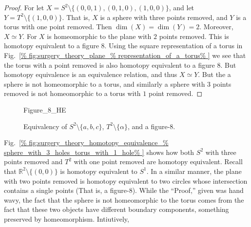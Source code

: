 \documentclass[crop=false,class=article,oneside]{standalone}
\begin{document}
        \begin{proof}
            For let
            $X=S^{2}\setminus\{(0,0,1),(0,1,0),(1,0,0)\}$,
            and let
            $Y=T^{2}\setminus\{(1,0,0)\}$.
            That is, $X$ is a sphere with three points removed,
            and $Y$ is a torus with one point removed. Then
            $\dim(X)=\dim(Y)=2$.
            Moreover, $X\simeq Y$. For $X$ is homeomorphic
            to the plane with $2$ points removed. This is
            homotopy equivalent to a figure $8$.
            Using the square representation of a torus in
            Fig.~\ref{%
                fig:surgery_theory_plane_%
                representation_of_a_torus%
            }
            we see that the torus with a point removed
            is also homotopy equivalent to a figure $8$.
            But homotopy equivalence is an equivalence
            relation, and thus $X\simeq Y$. But the a sphere
            is not homeomorphic to a torus, and similarly a
            sphere with $3$ points removed is not homeomorphic
            to a torus with $1$ point removed.
        \end{proof}
        \begin{figure}[H]
                \centering
                \captionsetup{type=figure}
                {Figure_8_HE}
                \caption{%
                    Equivalency of $S^{2}\setminus\{a,b,c\}$,
                    $T^{2}\setminus\{\alpha\}$,
                    and a figure-8.%
                }
                \label{%
                    fig:surgery_theory_homotopy_%
                    equivalence_sphere_with_3_%
                    holes_torus_with_1_hole%
                }
        \end{figure} 
        Fig.~\ref{%
            fig:surgery_theory_homotopy_equivalence_%
            sphere_with_3_holes_torus_with_1_hole%
        }
        shows how both $S^{2}$ with three points
        removed and $T^{2}$ with one point removed are
        homotopy equivalent. Recall that
        $\mathbb{R}^{2}\setminus \{(0,0)\}$ is homotopy
        equivalent to $S^{1}$. In a similar manner,
        the plane with two points removed is homotopy
        equivalent to two circles whose intersection
        contains a single points (That is, a figure-$8$).
        While the ``Proof,'' given was hand wavy,
        the fact that the sphere is not homeomorphic to the
        torus comes from the fact that these two objects
        have different boundary components, something
        preserved by homeomorphism. Intiutively,
\end{document}
